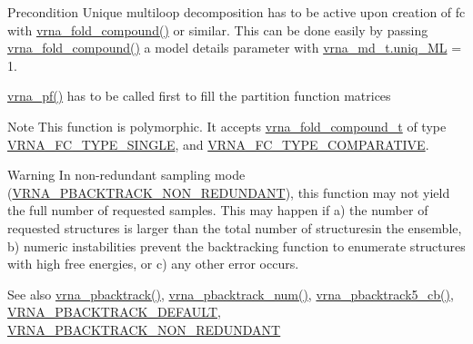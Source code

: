 \begin{DoxyPrecond}{Precondition}
Unique multiloop decomposition has to be active upon creation of {\ttfamily fc} with \mbox{\hyperlink{group__fold__compound_ga6601d994ba32b11511b36f68b08403be}{vrna\+\_\+fold\+\_\+compound()}} or similar. This can be done easily by passing \mbox{\hyperlink{group__fold__compound_ga6601d994ba32b11511b36f68b08403be}{vrna\+\_\+fold\+\_\+compound()}} a model details parameter with \mbox{\hyperlink{group__model__details_ade065b814a4e2e72ead93ab502613ed2}{vrna\+\_\+md\+\_\+t.\+uniq\+\_\+\+ML}} = 1. 

\mbox{\hyperlink{group__part__func__global_ga29e256d688ad221b78d37f427e0e99bc}{vrna\+\_\+pf()}} has to be called first to fill the partition function matrices
\end{DoxyPrecond}
\begin{DoxyNote}{Note}
This function is polymorphic. It accepts \mbox{\hyperlink{group__fold__compound_ga1b0cef17fd40466cef5968eaeeff6166}{vrna\+\_\+fold\+\_\+compound\+\_\+t}} of type \mbox{\hyperlink{group__fold__compound_gga01a4ff86fa71deaaa5d1abbd95a1447da7e264dd3cf2dc9b6448caabcb7763cd6}{V\+R\+N\+A\+\_\+\+F\+C\+\_\+\+T\+Y\+P\+E\+\_\+\+S\+I\+N\+G\+LE}}, and \mbox{\hyperlink{group__fold__compound_gga01a4ff86fa71deaaa5d1abbd95a1447dab821ce46ea3cf665be97df22a76f5023}{V\+R\+N\+A\+\_\+\+F\+C\+\_\+\+T\+Y\+P\+E\+\_\+\+C\+O\+M\+P\+A\+R\+A\+T\+I\+VE}}.
\end{DoxyNote}
\begin{DoxyWarning}{Warning}
In non-\/redundant sampling mode (\mbox{\hyperlink{group__subopt__stochbt_ga9d580ce645aa0c38b69afdf56c332200}{V\+R\+N\+A\+\_\+\+P\+B\+A\+C\+K\+T\+R\+A\+C\+K\+\_\+\+N\+O\+N\+\_\+\+R\+E\+D\+U\+N\+D\+A\+NT}}), this function may not yield the full number of requested samples. This may happen if a) the number of requested structures is larger than the total number of structuresin the ensemble, b) numeric instabilities prevent the backtracking function to enumerate structures with high free energies, or c) any other error occurs.
\end{DoxyWarning}
\begin{DoxySeeAlso}{See also}
\mbox{\hyperlink{group__subopt__stochbt_ga594844ac73c4e66e00d6791b31540634}{vrna\+\_\+pbacktrack()}}, \mbox{\hyperlink{group__subopt__stochbt_ga596ed9bcd86f629a7c7c59c58b297db5}{vrna\+\_\+pbacktrack\+\_\+num()}}, \mbox{\hyperlink{group__subopt__stochbt_ga626beb5b5b962d7e7c8433cd2cfd4e93}{vrna\+\_\+pbacktrack5\+\_\+cb()}}, \mbox{\hyperlink{group__subopt__stochbt_ga760aa2fb2d5e3d7521a11454a21e9b9f}{V\+R\+N\+A\+\_\+\+P\+B\+A\+C\+K\+T\+R\+A\+C\+K\+\_\+\+D\+E\+F\+A\+U\+LT}}, \mbox{\hyperlink{group__subopt__stochbt_ga9d580ce645aa0c38b69afdf56c332200}{V\+R\+N\+A\+\_\+\+P\+B\+A\+C\+K\+T\+R\+A\+C\+K\+\_\+\+N\+O\+N\+\_\+\+R\+E\+D\+U\+N\+D\+A\+NT}}
\end{DoxySeeAlso}

